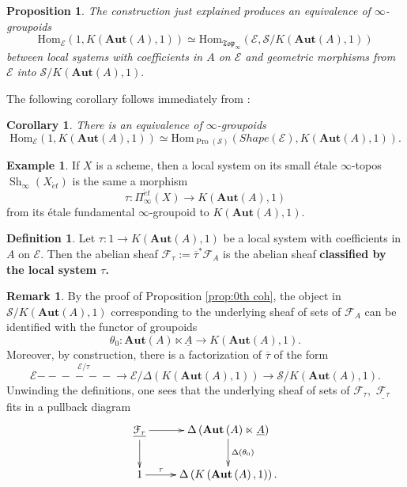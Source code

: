 \documentclass[12pt]{amsart}
\newtheorem{corollary}[dummy]{Corollary}
\newtheorem{proposition}[dummy]{Proposition}
\theoremstyle{definition}
\newtheorem{definition}[dummy]{Definition}
\newtheorem{example}[dummy]{Example}
\newtheorem{remark}[dummy]{Remark}
\newcommand{\cE}{\mathcal{E}}
\newcommand{\cF}{\mathcal{F}}
\newcommand{\cS}{\mathcal{S}}
\newcommand{\Sh}{\operatorname{Sh}}
\newcommand{\Hom}{\mathrm{Hom}}
\newcommand{\et}{\acute{e}t}
\renewcommand{\i}{\infty}
\def\Pro{\operatorname{Pro}}
\def\Shi{\Sh_\i}
\def\Shape{\mathit{Shape}}
\def\Aut{\mathbf{Aut}}
\def\longlongrightarrow{-\!\!\!-\!\!\!-\!\!\!-\!\!\!-\!\!\!-\!\!\!\longrightarrow}
\begin{document}
\begin{proposition}
The construction just explained produces an equivalence of $\i$-groupoids
$$\Hom_{\cE}\left(1,K\left(\Aut\left(A\right),1\right)\right) \simeq \Hom_{\mathfrak{Top}_\i}\left(\cE,\cS/K\left(\Aut\left(A\right),1\right)\right)$$ between local systems with coefficients in $A$ on $\cE$ and geometric morphisms from $\cE$ into $\cS/K\left(\Aut\left(A\right),1\right).$
\end{proposition}

The following corollary follows immediately from \cite[Remark 7.1.6.15]{htt}:

\begin{corollary}
There is an equivalence of $\i$-groupoids
$$\Hom_{\cE}\left(1,K\left(\Aut\left(A\right),1\right)\right) \simeq \Hom_{\Pro\left(\cS\right)}\left(\Shape\left(\cE\right),K\left(\Aut\left(A\right),1\right)\right).$$
\end{corollary}

\begin{example}
If $X$ is a scheme, then a local system on its small \'etale $\i$-topos $\Shi\left(X_{\et}\right)$ is the same a morphism $$\tau:\Pi^{\et}_\i\left(X\right) \to K\left(\Aut\left(A\right),1\right)$$ from its \'etale fundamental $\i$-groupoid to $K\left(\Aut\left(A\right),1\right).$
\end{example}

\begin{definition}
Let $\tau:1 \to K\left(\Aut\left(A\right),1\right)$ be a local system with coefficients in $A$ on $\cE.$ Then the abelian sheaf $\cF_\tau:=\overline{\tau}^*\cF_A$ is the abelian sheaf \textbf{classified by the local system $\tau$.}
\end{definition}

\begin{remark}\label{rmk:pullback set}
By the proof of Proposition \ref{prop:0th coh}, the object in $\cS/K\left(\Aut\left(A\right),1\right)$ corresponding to the underlying sheaf of sets of $\cF_A$ can be identified with the functor of groupoids $$\theta_0:\Aut\left(A\right) \ltimes \underline{A} \to K\left(\Aut\left(A\right),1\right).$$ Moreover, by construction, there is a factorization of $\overline{\tau}$ of the form
$$\cE \stackrel{\cE/\tau}{\longlongrightarrow} \cE/\Delta\left(K\left(\Aut\left(A\right),1\right)\right) \to \cS/K\left(\Aut\left(A\right),1\right).$$ Unwinding the definitions, one sees that the underlying sheaf of sets of $\cF_\tau,$ $\underline{\cF_\tau}$ fits in a pullback diagram
$$\xymatrix{\underline{\cF_\tau} \ar[r] \ar[d] & \Delta\left(\Aut\left(A\right) \ltimes \underline{A}\right) \ar[d]^-{\Delta\left(\theta_0\right)}\\
1 \ar[r]^-{\tau} & \Delta\left(K\left(\Aut\left(A\right),1\right)\right).}$$
\end{remark}
\end{document}
